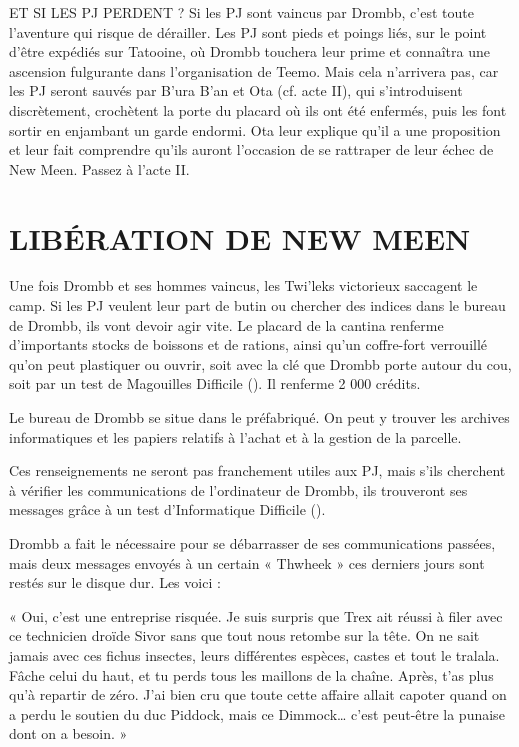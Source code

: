 \documentclass[a4paper,10pt,twoside,twocolumn,openany]{book}
\begin{document}
\begin{commentbox}{ET SI LES PJ PERDENT ?}
  Si les PJ sont vaincus par Drombb, c’est toute l’aventure qui risque de dérailler. Les PJ sont pieds et
poings liés, sur le point d’être expédiés sur Tatooine,
où Drombb touchera leur prime et connaîtra une ascension fulgurante dans l’organisation de Teemo.
Mais cela n’arrivera pas, car les PJ seront sauvés
par B’ura B’an et Ota (cf. acte II), qui s’introduisent
discrètement, crochètent la porte du placard où ils
ont été enfermés, puis les font sortir en enjambant
un garde endormi. Ota leur explique qu’il a une
proposition et leur fait comprendre qu’ils auront
l’occasion de se rattraper de leur échec de New
Meen. Passez à l’acte II.
\end{commentbox}



\section{LIBÉRATION DE
NEW MEEN}

Une fois Drombb et ses hommes vaincus, les Twi’leks victorieux saccagent le camp. Si les PJ veulent leur part de
butin ou chercher des indices dans le bureau de Drombb,
ils vont devoir agir vite. Le placard de la cantina renferme
d’importants stocks de boissons et de rations, ainsi qu’un
coffre-fort verrouillé qu’on peut plastiquer ou ouvrir, soit
avec la clé que Drombb porte autour du cou, soit par un
test de Magouilles Difficile (\difficulty \difficulty \difficulty). Il renferme 2 000
crédits.

Le bureau de Drombb se situe dans le préfabriqué. On
peut y trouver les archives informatiques et les papiers
relatifs à l’achat et à la gestion de la parcelle.

Ces renseignements ne seront pas franchement utiles
aux PJ, mais s’ils cherchent à vérifier les communications
de l’ordinateur de Drombb, ils trouveront ses messages
grâce à un test d’Informatique Difficile (\difficulty \difficulty \difficulty).


Drombb a fait le nécessaire pour se débarrasser de ses
communications passées, mais deux messages envoyés
à un certain « Thwheek » ces derniers jours sont restés
sur le disque dur. Les voici :
\begin{quotebox}
« Oui, c’est une entreprise risquée. Je suis surpris que Trex ait réussi à filer avec ce technicien
droïde Sivor sans que tout nous retombe sur la
tête. On ne sait jamais avec ces fichus insectes,
leurs différentes espèces, castes et tout le tralala. Fâche celui du haut, et tu perds tous les maillons de la chaîne. Après, t’as plus qu’à repartir
de zéro. J’ai bien cru que toute cette affaire allait capoter quand on a perdu le soutien du duc
Piddock, mais ce Dimmock… c’est peut-être la
punaise dont on a besoin. »\end{quotebox}
\end{document}
